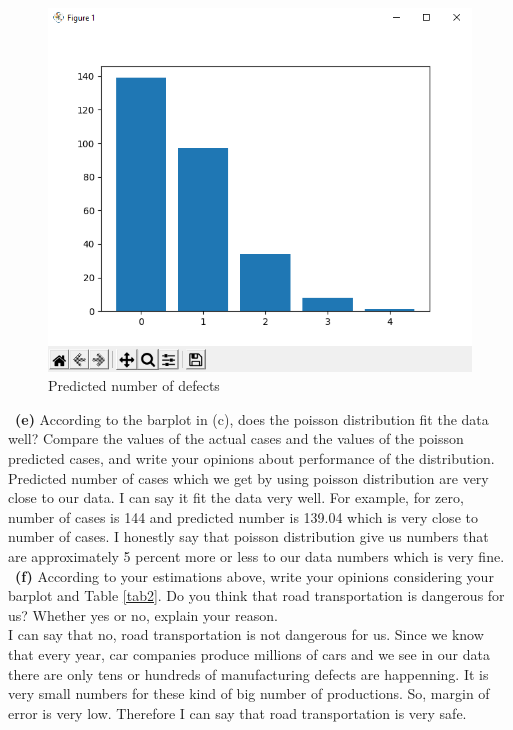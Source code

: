 \documentclass[a4 paper]{article}
\numberwithin{equation}{section}
\newcommand{\subproblem}[1]{~\newline\textbf{(#1)}}
\newcommand{\0}{\mathbf{0}}
\begin{document}
	\begin{figure}[H]
		\centering
		\includegraphics[width=0.7\linewidth]{2}
		\caption{Predicted number of defects}
		\label{fig:2}
	\end{figure}
	
	
	
	
	\subproblem{e} According to the barplot in (c), does the poisson distribution fit the data well? Compare the values of the actual cases and the values of the poisson predicted cases, and write your opinions about performance of the distribution.\\
	
	Predicted number of cases which we get by using poisson distribution are very close to our data. I can say it fit the data very well. For example, for zero, number of cases is 144 and predicted number is 139.04 which is very close to number of cases. I honestly say that poisson distribution give us numbers that are approximately 5 percent more or less to our data numbers which is very fine. \\
	
	\subproblem{f} According to your estimations above, write your opinions considering your barplot and Table \ref{tab2}. Do you think that road transportation is dangerous for us? Whether yes or no, explain your reason. \\
	
	I can say that no, road transportation is not dangerous for us. Since we know that every year, car companies produce millions of cars and we see in our data there are only tens or hundreds of manufacturing defects are happenning. It is very small numbers for these kind of big number of productions. So, margin of error is very low. Therefore I can say that road transportation is very safe. \\
	
\end{document}
